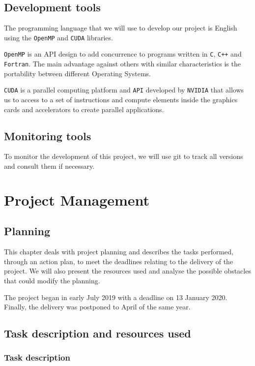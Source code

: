\documentclass[titlepage,12pt]{report}
\begin{document}
\section{Development tools}

The programming language that we will use to develop our project is English using the \texttt{OpenMP} and \texttt{CUDA} libraries.

\texttt{OpenMP} is an API design to add concurrence to programs written in \texttt{C}, \texttt{C++} and \texttt{Fortran}. The main advantage against others with similar characteristics is the portability between different Operating Systems.

\texttt{CUDA} is a parallel computing platform and \texttt{API} developed by \texttt{NVIDIA} that allows us to access to a set of instructions and compute elements inside the graphics cards and accelerators to create parallel applications.

\section{Monitoring tools}

To monitor the development of this project, we will use git to track all versions and consult them if necessary.

\chapter{Project Management}

\section{Planning}

This chapter deals with project planning and describes the tasks performed, through an action plan, to meet the deadlines relating to the delivery of the project. We will also present the resources used and analyse the possible obstacles that could modify the planning.

The project began in early July 2019 with a deadline on 13 January 2020. Finally, the delivery was postponed to April of the same year.

\section{Task description and resources used}

\subsection{Task description}
\end{document}
